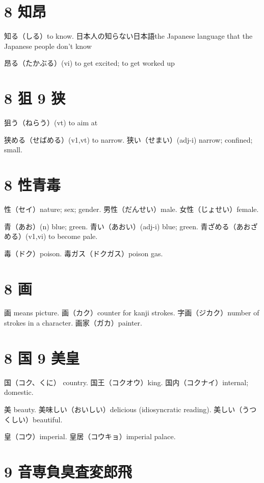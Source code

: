 \section{8 知昂}

知る（しる）to know.
日本人の知らない日本語the Japanese language that the Japanese people don't know

昂る（たかぶる）(vi) to get excited; to get worked up

\section{8 狙 9 狭}

狙う（ねらう）(vt) to aim at

狭める（せばめる）(v1,vt) to narrow.
狭い（せまい）(adj-i) narrow; confined; small.

\section{8 性青毒}

性（セイ）nature; sex; gender.
男性（だんせい）male.
女性（じょせい）female.

青（あお）(n) blue; green.
青い（あおい）(adj-i) blue; green.
青ざめる（あおざめる）(v1,vi) to become pale.

毒（ドク）poison.
毒ガス（ドクガス）poison gas.

\section{8 画}

画 means picture.
画（カク）counter for kanji strokes.
字画（ジカク）number of strokes in a character.
画家（ガカ）painter.

\section{8 国 9 美皇}

国（コク、くに） country.
国王（コクオウ）king.
国内（コクナイ）internal; domestic.

美 beauty.
美味しい（おいしい）delicious (idiosyncratic reading).
美しい（うつくしい）beautiful.

皇（コウ）imperial.
皇居（コウキョ）imperial palace.

\section{9 音専負臭査変郎飛}

